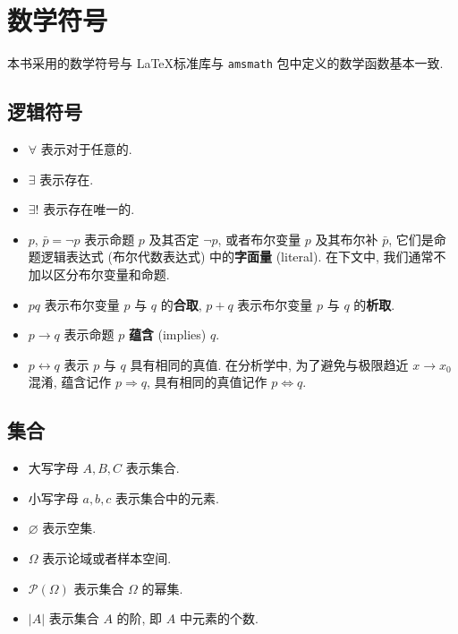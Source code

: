 \section*{数学符号}

本书采用的数学符号与 \LaTeX 标准库与 \lstinline|amsmath| 包中定义的数学函数基本一致.

\subsection*{逻辑符号}

\begin{itemize}
    \item $\forall$ 表示{\kaishu 对于任意的}.
    \item $\exists$ 表示{\kaishu 存在}.
    \item $\exists !$ 表示{\kaishu 存在唯一的}.
    \item $p$, $\bar p = \lnot p$ 表示命题 $p$ 及其否定 $\lnot p$,
    或者布尔变量 $p$ 及其布尔补 $\bar p$,
    它们是命题逻辑表达式 (布尔代数表达式) 中的{\bfseries 字面量} (literal).
    在下文中, 我们通常不加以区分布尔变量和命题.
    \item $pq$ 表示布尔变量 $p$ 与 $q$ 的{\bfseries 合取},
    $p+q$ 表示布尔变量 $p$ 与 $q$ 的{\bfseries 析取}.
    \item $p \to q$ 表示命题 $p$ {\bfseries 蕴含} (implies) $q$.
    \item $p \leftrightarrow q$ 表示 $p$ 与 $q$ {\kaishu 具有相同的真值}.
    在分析学中, 为了避免与极限趋近 $x \to x_0$ 混淆,
    蕴含记作 $p \Rightarrow q$,
    具有相同的真值记作 $p \Leftrightarrow q$.
\end{itemize}

\subsection*{集合}

\begin{itemize}
    \item 大写字母 $A, B, C$ 表示集合.
    \item 小写字母 $a, b, c$ 表示集合中的元素.
    \item $\varnothing$ 表示空集.
    \item $\Omega$ 表示论域或者样本空间.
    \item $\mathcal{P}(\Omega)$ 表示集合 $\Omega$ 的幂集.
    \item $|A|$ 表示集合 $A$ 的阶, 即 $A$ 中元素的个数.
\end{itemize}


